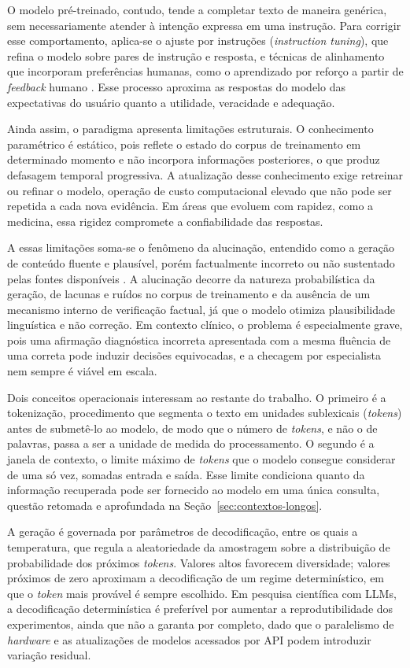 O modelo pré-treinado, contudo, tende a completar texto de maneira genérica, sem necessariamente atender à intenção expressa em uma instrução. Para corrigir esse comportamento, aplica-se o ajuste por instruções (\textit{instruction tuning}), que refina o modelo sobre pares de instrução e resposta, e técnicas de alinhamento que incorporam preferências humanas, como o aprendizado por reforço a partir de \textit{feedback} humano \citep{ouyang2022}. Esse processo aproxima as respostas do modelo das expectativas do usuário quanto a utilidade, veracidade e adequação.

Ainda assim, o paradigma apresenta limitações estruturais. O conhecimento paramétrico é estático, pois reflete o estado do corpus de treinamento em determinado momento e não incorpora informações posteriores, o que produz defasagem temporal progressiva. A atualização desse conhecimento exige retreinar ou refinar o modelo, operação de custo computacional elevado que não pode ser repetida a cada nova evidência. Em áreas que evoluem com rapidez, como a medicina, essa rigidez compromete a confiabilidade das respostas.

A essas limitações soma-se o fenômeno da alucinação, entendido como a geração de conteúdo fluente e plausível, porém factualmente incorreto ou não sustentado pelas fontes disponíveis \citep{ji2023}. A alucinação decorre da natureza probabilística da geração, de lacunas e ruídos no corpus de treinamento e da ausência de um mecanismo interno de verificação factual, já que o modelo otimiza plausibilidade linguística e não correção. Em contexto clínico, o problema é especialmente grave, pois uma afirmação diagnóstica incorreta apresentada com a mesma fluência de uma correta pode induzir decisões equivocadas, e a checagem por especialista nem sempre é viável em escala.

Dois conceitos operacionais interessam ao restante do trabalho. O primeiro é a tokenização, procedimento que segmenta o texto em unidades sublexicais (\textit{tokens}) antes de submetê-lo ao modelo, de modo que o número de \textit{tokens}, e não o de palavras, passa a ser a unidade de medida do processamento. O segundo é a janela de contexto, o limite máximo de \textit{tokens} que o modelo consegue considerar de uma só vez, somadas entrada e saída. Esse limite condiciona quanto da informação recuperada pode ser fornecido ao modelo em uma única consulta, questão retomada e aprofundada na Seção~\ref{sec:contextos-longos}.

A geração é governada por parâmetros de decodificação, entre os quais a temperatura, que regula a aleatoriedade da amostragem sobre a distribuição de probabilidade dos próximos \textit{tokens}. Valores altos favorecem diversidade; valores próximos de zero aproximam a decodificação de um regime determinístico, em que o \textit{token} mais provável é sempre escolhido. Em pesquisa científica com LLMs, a decodificação determinística é preferível por aumentar a reprodutibilidade dos experimentos, ainda que não a garanta por completo, dado que o paralelismo de \textit{hardware} e as atualizações de modelos acessados por API podem introduzir variação residual.

